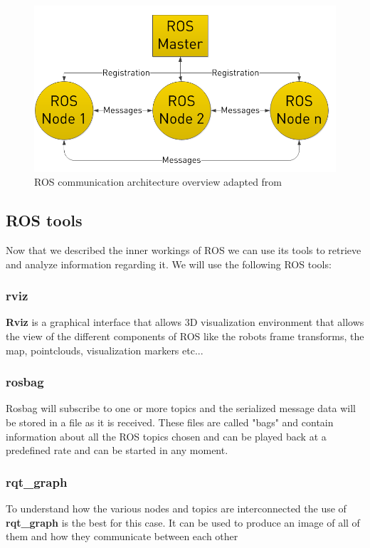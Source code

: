 \begin{figure}[ht!] 
\centerline{\includegraphics [width=0.6 \textwidth]{imgs/chapter3/rosgraph2.png}}
\caption[ROS communication architecture overview]{ROS communication architecture overview adapted from \cite{rosbasics}}
\label{fig:rosgraph}
\end{figure}


\subsection{ROS tools}
Now that we described the inner workings of \ac{ROS} we can use its tools to retrieve and analyze information regarding it. We will use the following \ac{ROS} tools:
\subsubsection{rviz}
\textbf{Rviz} is a graphical interface that allows 3D visualization environment that allows the view of the different components of \ac{ROS} like the robots frame transforms, the map, pointclouds, visualization markers etc...
\subsubsection{rosbag}
 Rosbag will subscribe to one or more topics and the serialized message data will be stored in a file as it is received. These files are called "bags" and contain information about all the \ac{ROS} topics chosen and can be played back at a predefined rate and can be started in any moment.
\subsubsection{rqt_graph}
To understand how the various nodes and topics are interconnected the use of \textbf{rqt_graph} is the best for this case. It can be used to produce an image of all of them and how they communicate between each other
